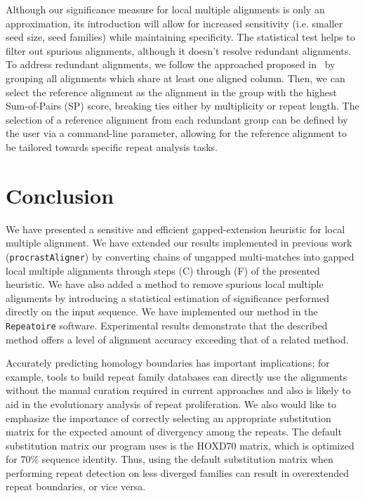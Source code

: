 \documentclass[12pt,journal,draftcls,letterpaper,onecolumn]{IEEEtran}
\begin{document}

Although our significance measure for local multiple alignments is only an approximation, its introduction will allow
for increased sensitivity (i.e. smaller seed size, seed families) while maintaining specificity. The statistical
test helps to filter out spurious alignments, although it doesn't resolve redundant alignments. To address redundant alignments, we follow
the approached proposed in~\cite{ref-related1} by grouping all alignments which share at least one aligned column. Then, we can select the reference alignment
as the alignment in the group with the highest Sum-of-Pairs (SP) score, breaking ties either by multiplicity or repeat length. The selection of a reference alignment from each redundant group can be defined by the user via a command-line parameter, allowing for the reference alignment to be tailored towards specific repeat analysis tasks.



\section{Conclusion}
We have presented a sensitive and efficient gapped-extension heuristic for local
multiple alignment. We have extended our results implemented in previous work (\texttt{procrastAligner}) by
converting chains of ungapped multi-matches into gapped local multiple
alignments through steps (C) through (F) of the presented heuristic. We have also added a method to remove spurious local multiple alignments by introducing a statistical estimation of significance
performed directly on the input sequence. We have implemented our method in the \texttt{Repeatoire} software. Experimental results demonstrate that the
described method offers a level of alignment accuracy exceeding
that of a related method.

Accurately predicting homology boundaries has important implications; for example, tools to build repeat family databases can directly use the alignments without the manual curation required in current approaches and also is likely to aid in the evolutionary analysis of repeat proliferation.  We also would like to emphasize the importance of correctly selecting an appropriate substitution matrix for the expected amount of divergency among the repeats. The default substitution matrix our program uses is the HOXD70 matrix, which is optimized for 70\% sequence identity. Thus, using the default substitution matrix when performing repeat detection on less diverged families can result in overextended repeat boundaries, or vice versa.
\end{document}
